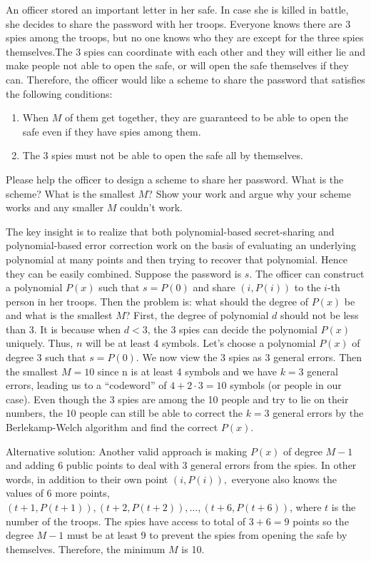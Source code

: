 \question An officer stored an important letter in her safe. In case 
she is killed in battle, she decides to share the password with her 
troops. Everyone knows there are 3 spies among the troops, but no one 
knows who they are except for the three spies themselves.The 3 spies 
can coordinate with each other and they will either lie and make people 
not able to open the safe, or will open the safe themselves if they can. 
Therefore, the officer would like a scheme to share the password that 
satisfies the following conditions: 
 \begin{enumerate}
\item When $M$ of them get together, they are guaranteed to be able to 
open the safe even if they have spies among them. 
\item The 3 spies must not be able to open the safe all by themselves. 
 \end{enumerate}
 
Please help the officer to design a scheme to share her password. What 
is the scheme? What is the smallest $M$? Show your work and argue why 
your scheme works and any smaller $M$ couldn’t work.

\begin{solution}
The key insight is to realize that both polynomial-based secret-sharing 
and polynomial-based error correction work on the basis of evaluating 
an underlying polynomial at many points and then trying to recover that 
polynomial. Hence they can be easily combined. Suppose the password is 
$s$. The officer can construct a polynomial $P(x)$ such that $s = P(0)$ and 
share $(i,P(i))$ to the $i$-th person in her troops. Then the problem is: 
what should the degree of $P(x)$ be and what is the smallest $M$? 
First, the degree of polynomial $d$ should not be less than 3. It is 
because when $d < 3$, the 3 spies can decide the polynomial $P(x)$ uniquely. 
Thus, $n$ will be at least 4 symbols. Let’s choose a polynomial $P(x)$ of 
degree 3 such that $s = P(0)$. We now view the 3 spies as 3 general errors. 
Then the smallest $M = 10$ since n is at least 4 symbols and we have $k = 3 $
general errors, leading us to a “codeword” of $4+2 \cdot 3 = 10$ symbols 
(or people in our case). Even though the 3 spies are among the 10 people 
and try to lie on their numbers, the 10 people can still be able to 
correct the $k = 3$ general errors by the Berlekamp-Welch algorithm and 
find the correct $P(x)$. 

Alternative solution: Another valid approach is making $P(x)$ of degree 
$M − 1$ and adding 6 public points to deal with 3 general errors from 
the spies. In other words, in addition to their own point $(i,P(i)), $
 everyone also knows the values of 6 more points, 
$(t +1,P(t +1)),(t +2,P(t +2)), \dotsc ,(t +6,P(t +6))$, where $t$ is the number 
of the troops. The spies have access to total of $3+6 = 9$ points so the 
degree $M - 1 $ must be at least 9 to prevent the spies from opening the 
safe by themselves. Therefore, the minimum $M$ is 10.
\end{solution}